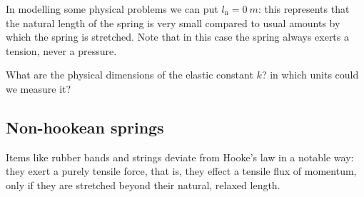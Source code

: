 \documentclass[a4paper,12pt,%
onecolumn,oneside,%
british%
]{memoir}
\renewcommand*{\|}[1][]{\nonscript\:#1\vert\nonscript\:\mathopen{}}
\newcommand*{\ylo}{l_{\textrm{n}}}
\begin{document}
In modelling some physical problems we can put $\ylo=\qty{0}{m}$: this represents that the natural length of the spring is very small compared to usual amounts by which the spring is stretched. Note that in this case the spring always exerts a tension, never a pressure.

\begin{exercise}
  What are the physical dimensions of the elastic constant $k$? in which units could we measure it?
\end{exercise}

\subsection{Non-hookean springs}
\label{sec:nonhooke}

Items like rubber bands and strings deviate from Hooke's law in a notable way: they exert a purely tensile force, that is, they effect a tensile flux of momentum, only if they are stretched beyond their natural, relaxed length.
\end{document}
